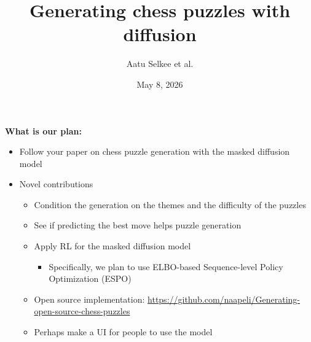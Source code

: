 \documentclass{beamer}
\title{Generating chess puzzles with diffusion}
\author{Aatu Selkee et al.}
\institute{Aalto University}
\date{May 8, 2026}
\begin{document}
\begin{frame}
    \titlepage
\end{frame}



\begin{frame}
    \textbf{What is our plan:}
    \begin{itemize}
        \item Follow your paper on chess puzzle generation with the masked diffusion model%
        \item Novel contributions
        \begin{itemize}
            \item Condition the generation on the themes and the difficulty of the puzzles
            \item See if predicting the best move helps puzzle generation
            \item Apply RL for the masked diffusion model
            \begin{itemize}
                \item Specifically, we plan to use  ELBO-based Sequence-level Policy Optimization (ESPO)%
            \end{itemize}
            \item Open source implementation: \url{https://github.com/naapeli/Generating-open-source-chess-puzzles}
            \item Perhaps make a UI for people to use the model
        \end{itemize}
    \end{itemize}
\end{frame}
\end{document}

